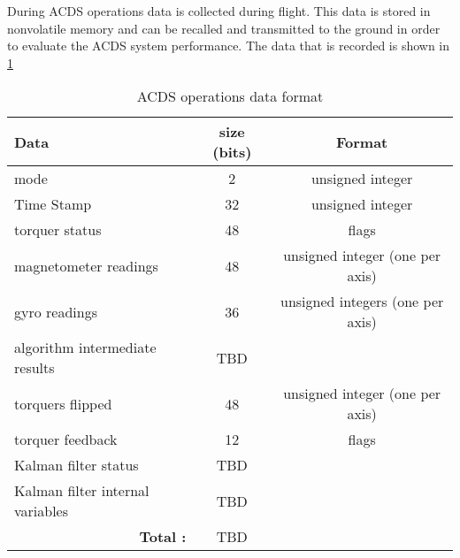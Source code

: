 During \ac{ACDS} operations data is collected during flight. This data is stored in nonvolatile memory and can be recalled and transmitted to the ground in order to evaluate the \ac{ACDS} system performance. The data that is recorded is shown in \cref{tab:logdat}

\begin{comment}
\begin{itemize}
    \item magnetometer and gyro readings
    \item torquer status
    \item mode
    \item algorithm intermediate results
    \item torquers flipped
    \item torquer feedback
    \item Kalman filter status
    \item Kalman filter internal variables
    \item Kalman filter state
    \item \todo[inline]{More?}
\end{itemize}
\end{comment}

\begin{table}[H]
    \centering
    \caption{\ac{ACDS} operations data format}
    \label{tab:logdat}
    \begin{tabular}{|l|c|c|}
        \hline
        Data&size (bits)&Format\\
        \hline
        mode&2&unsigned integer\\
        \hline
        Time Stamp&32&unsigned integer\\
        \hline
        torquer status&48&flags\\
        \hline
        magnetometer readings&48&unsigned integer (one per axis)\\
        \hline
        gyro readings&36&unsigned integers (one per axis)\\
        \hline
        algorithm intermediate results&TBD&\\
        \hline
        torquers flipped&48&unsigned integer (one per axis)\\
        \hline
        torquer feedback&12&flags\\
        \hline
        Kalman filter status&TBD&\\
        \hline
        Kalman filter internal variables&TBD&\\
        \hline
        \multicolumn{1}{|r|}{\bfseries Total :}&TBD&\\
        \hline
    \end{tabular}
\end{table}

